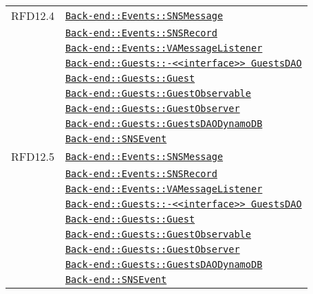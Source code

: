 \begin{longtable}{|>{\centering}m{3cm}|m{10cm}<{\centering}|}
RFD12.4 & \hyperref[Back-end::Events::SNSMessage]{\texttt{Back-end::Events::SNSMessage}}\\
& \hyperref[Back-end::Events::SNSRecord]{\texttt{Back-end::Events::SNSRecord}}\\
& \hyperref[Back-end::Events::VAMessageListener]{\texttt{Back-end::Events::VAMessageListener}}\\
& \hyperref[Back-end::Guests::<<interface>> GuestsDAO]{\texttt{Back-end::Guests::-\linebreak <<interface>> GuestsDAO}}\\
& \hyperref[Back-end::Guests::Guest]{\texttt{Back-end::Guests::Guest}}\\
& \hyperref[Back-end::Guests::GuestObservable]{\texttt{Back-end::Guests::GuestObservable}}\\
& \hyperref[Back-end::Guests::GuestObserver]{\texttt{Back-end::Guests::GuestObserver}}\\
& \hyperref[Back-end::Guests::GuestsDAODynamoDB]{\texttt{Back-end::Guests::GuestsDAODynamoDB}}\\
& \hyperref[Back-end::SNSEvent]{\texttt{Back-end::SNSEvent}}\\ \hline

RFD12.5 & \hyperref[Back-end::Events::SNSMessage]{\texttt{Back-end::Events::SNSMessage}}\\
& \hyperref[Back-end::Events::SNSRecord]{\texttt{Back-end::Events::SNSRecord}}\\
& \hyperref[Back-end::Events::VAMessageListener]{\texttt{Back-end::Events::VAMessageListener}}\\
& \hyperref[Back-end::Guests::<<interface>> GuestsDAO]{\texttt{Back-end::Guests::-\linebreak <<interface>> GuestsDAO}}\\
& \hyperref[Back-end::Guests::Guest]{\texttt{Back-end::Guests::Guest}}\\
& \hyperref[Back-end::Guests::GuestObservable]{\texttt{Back-end::Guests::GuestObservable}}\\
& \hyperref[Back-end::Guests::GuestObserver]{\texttt{Back-end::Guests::GuestObserver}}\\
& \hyperref[Back-end::Guests::GuestsDAODynamoDB]{\texttt{Back-end::Guests::GuestsDAODynamoDB}}\\
& \hyperref[Back-end::SNSEvent]{\texttt{Back-end::SNSEvent}}\\ \hline


\end{longtable}
